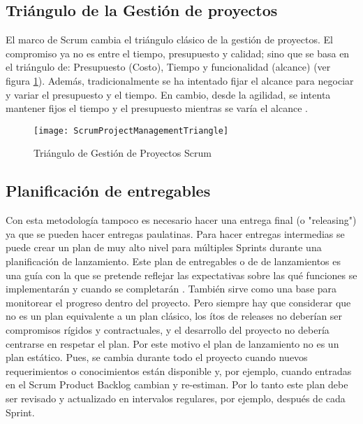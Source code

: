 \subsection{Triángulo de la Gestión de proyectos}

El marco de Scrum cambia el triángulo clásico de la gestión de proyectos. El compromiso ya no es entre el tiempo, presupuesto y calidad; sino que se basa en el triángulo de: Presupuesto (Costo), Tiempo y funcionalidad (alcance) (ver figura \ref{fig:ScrumProjectManagementTriangle}). Además, tradicionalmente se ha intentado fijar el alcance para negociar y variar el presupuesto y el tiempo. En cambio, desde la agilidad, se intenta mantener fijos el tiempo y el presupuesto mientras se varía el alcance \cite{Martin-Alaimo-2014}.

\begin{figure}[h]
  \centering
  \texttt{[image: ScrumProjectManagementTriangle]}
  \caption{Triángulo de Gestión de Proyectos Scrum}
  \centering
  \label{fig:ScrumProjectManagementTriangle} %
\end{figure}

\subsection{Planificación de entregables}

Con esta metodología tampoco es necesario hacer una entrega final (o "releasing") ya que se pueden hacer entregas paulatinas. Para hacer entregas intermedias se puede crear un plan de muy alto nivel para múltiples Sprints durante una planificación de lanzamiento. Este plan de entregables o de de lanzamientos es una guía con la que se pretende reflejar las expectativas sobre las qué funciones se implementarán y cuando se completarán \cite{Scrum-Institute-2015}. También sirve como una base para monitorear el progreso dentro del proyecto. Pero siempre hay que considerar que no es un plan equivalente a un plan clásico, los ítos de releases no deberían ser compromisos rígidos y contractuales, y el desarrollo del proyecto no debería centrarse en respetar el plan. Por este motivo el plan de lanzamiento no es un plan estático. Pues, se cambia durante todo el proyecto cuando nuevos requerimientos o conocimientos están disponible y, por ejemplo, cuando entradas en el Scrum Product Backlog cambian y re-estiman. Por lo tanto este plan debe ser revisado y actualizado en intervalos regulares, por ejemplo, después de cada Sprint.

